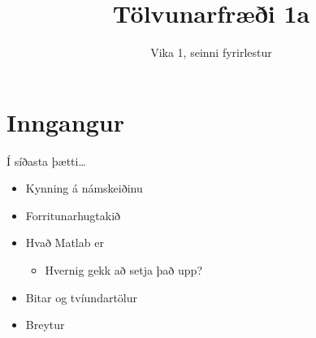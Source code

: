 \documentclass{beamer}
\title{Tölvunarfræði 1a}
\subtitle{Vika 1, seinni fyrirlestur}
\begin{document}
\begin{frame}
\titlepage
\end{frame}

\section{Inngangur}

\begin{frame}{Í síðasta þætti\ldots}
\begin{itemize}
 \item Kynning á námskeiðinu
 \item Forritunarhugtakið
 \item Hvað Matlab er
 \begin{itemize}
  \item Hvernig gekk að setja það upp?
 \end{itemize}
 \item Bitar og tvíundartölur
 \item Breytur
\end{itemize}
\end{frame}
\end{document}
